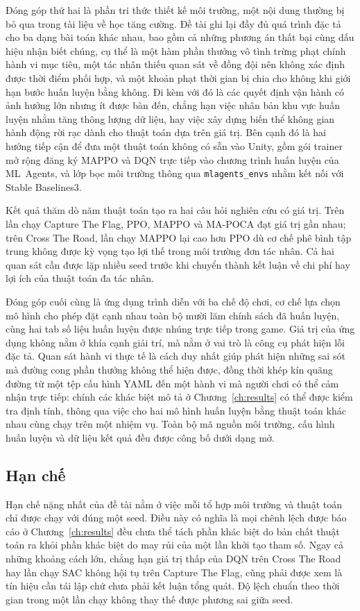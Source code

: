 \indent Đóng góp thứ hai là phần tri thức thiết kế môi trường, một nội dung thường bị bỏ
qua trong tài liệu về học tăng cường. Đề tài ghi lại đầy đủ quá trình đặc tả cho ba dạng
bài toán khác nhau, bao gồm cả những phương án thất bại cùng dấu hiệu nhận biết chúng, cụ
thể là một hàm phần thưởng vô tình trừng phạt chính hành vi mục tiêu, một tác nhân thiếu
quan sát về đồng đội nên không xác định được thời điểm phối hợp, và một khoản phạt thời
gian bị chia cho không khi giới hạn bước huấn luyện bằng không. Đi kèm với đó là các quyết
định vận hành có ảnh hưởng lớn nhưng ít được bàn đến, chẳng hạn việc nhân bản khu vực
huấn luyện nhằm tăng thông lượng dữ liệu, hay việc xây dựng biến thể không gian hành động
rời rạc dành cho thuật toán dựa trên giá trị. Bên cạnh đó là hai hướng tiếp cận để đưa một
thuật toán không có sẵn vào Unity, gồm gói trainer mở rộng đăng ký MAPPO và DQN trực tiếp
vào chương trình huấn luyện của ML~Agents, và lớp bọc môi trường thông qua
\texttt{mlagents\_envs} nhằm kết nối với Stable Baselines3.

\indent Kết quả thăm dò năm thuật toán tạo ra hai câu hỏi nghiên cứu có giá trị. Trên lần
chạy Capture The Flag, PPO, MAPPO và MA-POCA đạt giá trị gần nhau; trên Cross The Road,
lần chạy MAPPO lại cao hơn PPO dù cơ chế phê bình tập trung không được kỳ vọng tạo lợi thế
trong môi trường đơn tác nhân. Cả hai quan sát cần được lặp nhiều seed trước khi chuyển
thành kết luận về chi phí hay lợi ích của thuật toán đa tác nhân.

\indent Đóng góp cuối cùng là ứng dụng trình diễn với ba chế độ chơi, cơ chế lựa chọn mô
hình cho phép đặt cạnh nhau toàn bộ mười lăm chính sách đã huấn luyện, cùng hai tab số
liệu huấn luyện được nhúng trực tiếp trong game. Giá trị của ứng dụng không nằm ở khía
cạnh giải trí, mà nằm ở vai trò là công cụ phát hiện lỗi đặc tả. Quan sát hành vi thực tế
là cách duy nhất giúp phát hiện những sai sót mà đường cong phần thưởng không thể hiện
được, đồng thời khép kín quãng đường từ một tệp cấu hình YAML đến một hành vi mà người
chơi có thể cảm nhận trực tiếp: chính các khác biệt mô tả ở Chương~\ref{ch:results} có thể
được kiểm tra định tính, thông qua việc cho hai mô hình huấn luyện bằng
thuật toán khác nhau cùng chạy trên một nhiệm vụ. Toàn bộ mã nguồn môi trường, cấu hình
huấn luyện và dữ liệu kết quả đều được công bố dưới dạng mở.

\subsection{Hạn chế}
\label{sub:limits}
\indent Hạn chế nặng nhất của đề tài nằm ở việc mỗi tổ hợp môi trường và thuật toán chỉ
được chạy với đúng một seed. Điều này có nghĩa là mọi chênh lệch được báo
cáo ở Chương~\ref{ch:results} đều chưa thể tách phần khác biệt do bản chất thuật toán ra
khỏi phần khác biệt do may rủi của một lần khởi tạo tham số. Ngay cả những khoảng cách
lớn, chẳng hạn giá trị thấp của DQN trên Cross The Road hay lần chạy SAC không hội tụ trên
Capture The Flag, cũng phải được xem là tín hiệu cần tái lập chứ chưa phải kết luận tổng
quát. Độ lệch chuẩn theo thời gian trong một lần chạy không thay thế được phương sai giữa seed.

